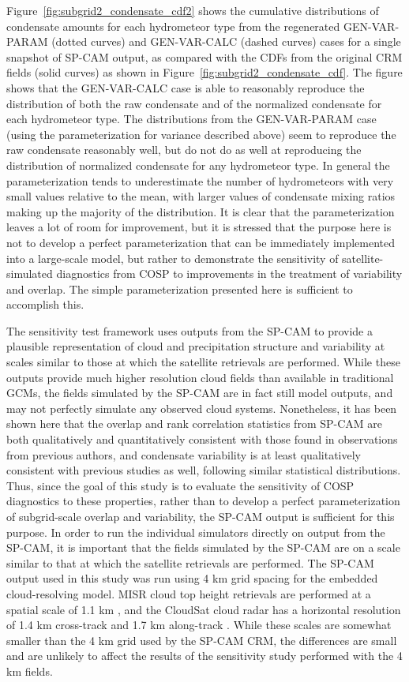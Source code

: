Figure~\ref{fig:subgrid2_condensate_cdf2} shows the cumulative
distributions of condensate amounts for each hydrometeor type from the
regenerated GEN-VAR-PARAM (dotted curves) and GEN-VAR-CALC (dashed
curves) cases for a single snapshot of SP-CAM output, as compared with
the CDFs from the original CRM fields (solid curves) as shown in
Figure~\ref{fig:subgrid2_condensate_cdf}. The figure shows that the
GEN-VAR-CALC case is able to reasonably reproduce the distribution of
both the raw condensate and of the normalized condensate for each
hydrometeor type. The distributions from the GEN-VAR-PARAM case (using
the parameterization for variance described above) seem to reproduce the
raw condensate reasonably well, but do not do as well at reproducing the
distribution of normalized condensate for any hydrometeor type. In
general the parameterization tends to underestimate the number of
hydrometeors with very small values relative to the mean, with larger
values of condensate mixing ratios making up the majority of the
distribution. It is clear that the parameterization leaves a lot of room
for improvement, but it is stressed that the purpose here is not to
develop a perfect parameterization that can be immediately implemented
into a large-scale model, but rather to demonstrate the sensitivity of
satellite-simulated diagnostics from COSP to improvements in the
treatment of variability and overlap. The simple parameterization
presented here is sufficient to accomplish this.

The sensitivity test framework uses outputs from the SP-CAM to provide a
plausible representation of cloud and precipitation structure and
variability at scales similar to those at which the satellite retrievals
are performed. While these outputs provide much higher resolution cloud
fields than available in traditional GCMs, the fields simulated by the
SP-CAM are in fact still model outputs, and may not perfectly simulate
any observed cloud systems. Nonetheless, it has been shown here that the
overlap and rank correlation statistics from SP-CAM are both
qualitatively and quantitatively consistent with those found in
observations from previous authors, and condensate variability is at
least qualitatively consistent with previous studies as well, following
similar statistical distributions. Thus, since the goal of this study is
to evaluate the sensitivity of COSP diagnostics to these properties,
rather than to develop a perfect parameterization of subgrid-scale
overlap and variability, the SP-CAM output is sufficient for this
purpose. In order to run the individual simulators directly on output
from the SP-CAM, it is important that the fields simulated by the SP-CAM
are on a scale similar to that at which the satellite retrievals are
performed. The SP-CAM output used in this study was run using 4 km grid
spacing for the embedded cloud-resolving model. MISR cloud top height
retrievals are performed at a spatial scale of 1.1 km
\citep{moroney_et_al_2002}, and the CloudSat cloud radar has a
horizontal resolution of 1.4 km cross-track and 1.7 km along-track
\citep{tanelli_et_al_2008}. While these scales are somewhat smaller than
the 4 km grid used by the SP-CAM CRM, the differences are small and are
unlikely to affect the results of the sensitivity study performed with
the 4 km fields.

